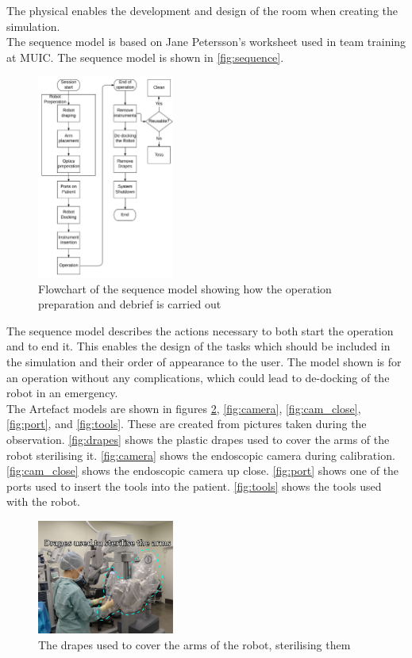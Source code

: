 The physical enables the development and design of the room when creating the simulation.\\

The sequence model is based on Jane Petersson's worksheet used in team training at MUIC. The sequence model is shown in \autoref{fig:sequence}.

\begin{figure}[hbpt]
	\centering
	\includegraphics[width=0.4\textwidth]{FieldStudies/figures/sequencemodel}
	\caption{Flowchart of the sequence model showing how the operation preparation and debrief is carried out}
	\label{fig:sequence}
\end{figure}

The sequence model describes the actions necessary to both start the operation and to end it. This enables the design of the tasks which should be included in the simulation and their order of appearance to the user.
The model shown is for an operation without any complications, which could lead to de-docking of the robot in an emergency.\\


The Artefact models are shown in figures \ref{fig:drapes}, \ref{fig:camera}, \ref{fig:cam_close}, \ref{fig:port}, and \ref{fig:tools}. These are created from pictures taken during the observation. \autoref{fig:drapes} shows the plastic drapes used to cover the arms of the robot sterilising it. \autoref{fig:camera} shows the endoscopic camera during calibration. \autoref{fig:cam_close} shows the endoscopic camera up close. \autoref{fig:port} shows one of the ports used to insert the tools into the patient. \autoref{fig:tools} shows the tools used with the robot.


\begin{figure}[hbpt]
	\centering
	\includegraphics[width=0.4\textwidth]{FieldStudies/figures/drapes.pdf}
	\caption{The drapes used to cover the arms of the robot, sterilising them}
	\label{fig:drapes}
\end{figure}

